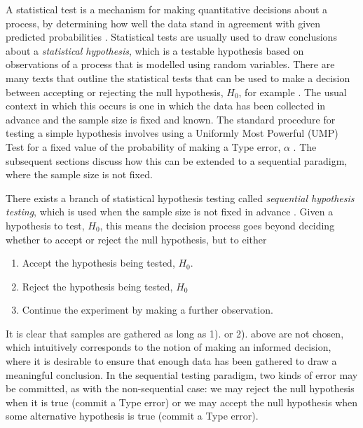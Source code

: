 

A statistical test is a mechanism for making quantitative decisions about a process, by determining how well the data stand in agreement with given predicted probabilities \cite{cowan1998statistical}. Statistical tests are usually used to draw conclusions about a \textit{statistical hypothesis}, which is a testable hypothesis based on observations of a process that is modelled using random variables. There are many texts that outline the statistical tests that can be used to make a decision between accepting or rejecting the null hypothesis, $H_0$, for example \cite{IntroductionToMathematicalStatistics}. The usual context in which this occurs is one in which the data has been collected in advance and the sample size is fixed and known. The standard procedure for testing a simple hypothesis involves using a Uniformly Most Powerful (UMP) Test for a fixed value of the probability of making a Type  error, $\alpha$ \cite[p.~253]{IntroductionToMathematicalStatistics}. The subsequent sections discuss how this can be extended to a sequential paradigm, where the sample size is not fixed. \par

There exists a branch of statistical hypothesis testing called \textit{sequential hypothesis testing}, which is used when the sample size is not fixed in advance \cite[p.~375]{IntroductionToMathematicalStatistics}. Given a hypothesis to test, $H_0$, this means the decision process goes beyond deciding whether to accept or reject the null hypothesis, but to either
\begin{enumerate}
    \item Accept the hypothesis being tested, $H_0$.
    \item Reject the hypothesis being tested, $H_0$
    \item Continue the experiment by making a further observation.
\end{enumerate}

It is clear that samples are gathered as long as 1). or 2). above are not chosen, which intuitively corresponds to the notion of making an informed decision, where it is desirable to ensure that enough data has been gathered to draw a meaningful conclusion. In the sequential testing paradigm, two kinds of error may be committed, as with the non-sequential case: we may reject the null hypothesis when it is true (commit a Type  error) or we may accept the null hypothesis when some alternative hypothesis is true (commit a Type  error). 

